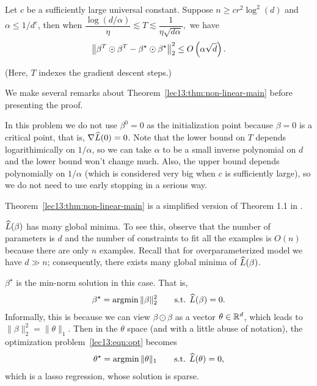 \begin{theorem}\label{lec13:thm:non-linear-main}
Let $c$ be a sufficiently large universal constant. Suppose $n\ge cr^2\log^2(d)$ and $\alpha\le 1 / d^c$, then when $\dfrac{\log(d/\alpha)}{\eta}\lesssim T\lesssim \dfrac{1}{\eta\sqrt{d\alpha}},$ we have
\begin{equation}\label{lec13:eqn:non-linear-main}
    \left\|\beta^T\odot\beta^T-\beta^\star\odot\beta^\star \right\|_2^2\le O \left( \alpha\sqrt{d} \right).
\end{equation}

(Here, $T$ indexes the gradient descent steps.)
\end{theorem}

We make several remarks about Theorem~\ref{lec13:thm:non-linear-main} before presenting the proof.

\begin{remark}
In this problem we do not use $\beta^0=0$ as the initialization point because $\beta=0$ is a critical point, that is, $\nabla\widehat{L}(0)=0$. Note that the lower bound on $T$ depends logarithimically on $1/\alpha$, so we can take $\alpha$ to be a small inverse polynomial on $d$ and the lower bound won't change much. Also, the upper bound depends polynomially on $1/\alpha$ (which is considered very big when $c$ is sufficiently large), so we do not need to use early stopping in a serious way.
\end{remark}

\begin{remark}
Theorem~\ref{lec13:thm:non-linear-main} is a simplified version of Theorem 1.1 in \cite{li2018algorithmic}.
\end{remark}

\begin{remark}
$\widehat{L}(\beta)$ has many global minima. To see this, observe that the number of parameters is $d$ and the number of constraints to fit all the examples is $O(n)$ because there are only $n$ examples. Recall that for overparameterized model we have $d\gg n$; consequently, there exists many global minima of $\widehat{L}(\beta)$.
\end{remark}

\begin{remark}
$\beta^\star$ is the min-norm solution in this case. That is,
    \begin{align}\label{lec13:eqn:opt}
        \beta^\star=\operatorname*{\textup{argmin}} \|\beta\|_2^2\qquad \text{s.t. }\widehat{L}(\beta)=0.
    \end{align}
    Informally, this is because we can view $\beta\odot \beta$ as a vector $\theta\in \mathbb R^{d}$, which leads to $\|\beta\|_2^2 =\|\theta\|_1.$ Then in the $\theta$ space (and with a little abuse of notation), the optimization problem~\eqref{lec13:eqn:opt} becomes
    \begin{align}\label{lec13:eqn:opt-theta}
        \theta^\star=\operatorname*{\textup{argmin}} \|\theta\|_1 \qquad \text{s.t. }\widehat{L}(\theta)=0,
    \end{align}
    which is a lasso regression, whose solution is sparse.
\end{remark}

